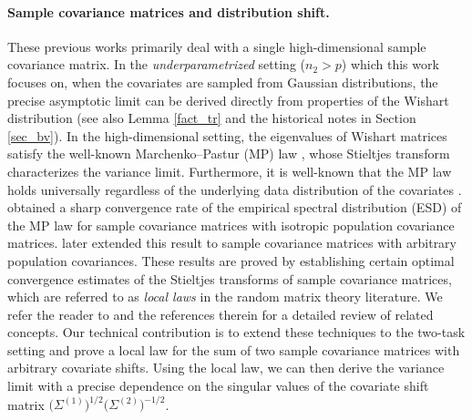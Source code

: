 \paragraph{Sample covariance matrices and distribution shift.}
These previous works primarily deal with a single high-dimensional sample covariance matrix. %
In the \textit{underparametrized} setting ($n_2 > p$) which this work focuses on, when the covariates are sampled from Gaussian distributions, the precise asymptotic limit can be derived directly from properties of the Wishart distribution (see also Lemma \ref{fact_tr} and the historical notes in Section \ref{sec_bv}).
In the high-dimensional setting, the eigenvalues of Wishart matrices satisfy the well-known Marchenko–Pastur (MP) law \cite{MP}, whose Stieltjes transform characterizes the variance limit.
Furthermore, it is well-known that the MP law holds universally regardless of the underlying data distribution of the covariates \cite{bai2010spectral}. \citet{isotropic} obtained a sharp convergence rate of the empirical spectral distribution (ESD) of the MP law for sample covariance matrices with isotropic population covariance matrices. \citet{Anisotropic,DY} later extended this result to sample covariance matrices with arbitrary population covariances. These results are proved by establishing certain optimal convergence estimates of the Stieltjes transforms of sample covariance matrices, which are referred to as \emph{local laws} in the random matrix theory literature. We refer the reader to \cite{erdos2017dynamical} and the references therein for a detailed review of related concepts.
Our technical contribution is to extend these techniques to the two-task setting and prove a local law for the sum of two sample covariance matrices with arbitrary covariate shifts.
Using the local law, we can then derive the variance limit with a precise dependence on the singular values of the covariate shift matrix $\big(\Sigma^{(1)}\big)^{1/2} \big(\Sigma^{(2)}\big)^{-1/2}$. 





